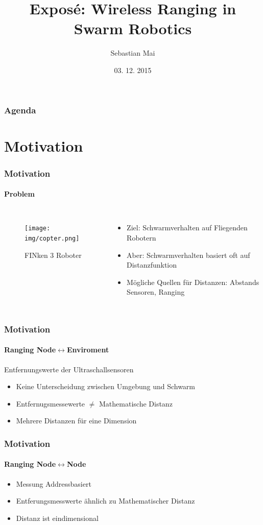 \documentclass{beamer}
\title{Exposé: Wireless Ranging in Swarm Robotics}
\author{Sebastian Mai}
\date{03. 12. 2015}
\begin{document}
\begin{frame}[plain]
	\titlepage
\end{frame}



\section[Agenda]{}
\begin{frame}
	\frametitle{Agenda}
	\tableofcontents
\end{frame}

\section{Motivation}
\begin{frame}
	\frametitle{Motivation}
	\framesubtitle{Problem}
	\begin{columns}
		\begin{figure}
			\centering
			\texttt{[image: img/copter.png]}
			\caption{FINken 3 Roboter}
		\end{figure}
		\begin{itemize}
			\item Ziel: Schwarmverhalten auf Fliegenden Robotern
			\item Aber: Schwarmverhalten basiert oft auf Distanzfunktion
			\item Mögliche Quellen für Distanzen: Abstands Sensoren, Ranging
		\end{itemize}
	\end{columns}
\end{frame}

\begin{frame}
	\frametitle{Motivation}
	\framesubtitle{Ranging Node$\leftrightarrow$Enviroment}
	Entfernungswerte der Ultraschallsensoren
	\begin{itemize}
		\item Keine Unterscheidung zwischen Umgebung und Schwarm
		\item Entfernugsmessewerte $\neq$ Mathematische Distanz
		\item Mehrere Distanzen für eine Dimension
	\end{itemize}
\end{frame}
\begin{frame}
	\frametitle{Motivation}
	\framesubtitle{Ranging Node$\leftrightarrow$Node}
	\begin{itemize}
		\item Messung Addressbasiert
		\item Entferungsmesswerte ähnlich zu Mathematischer Distanz
		\item Distanz ist eindimensional
	\end{itemize}
\end{frame}
\end{document}
